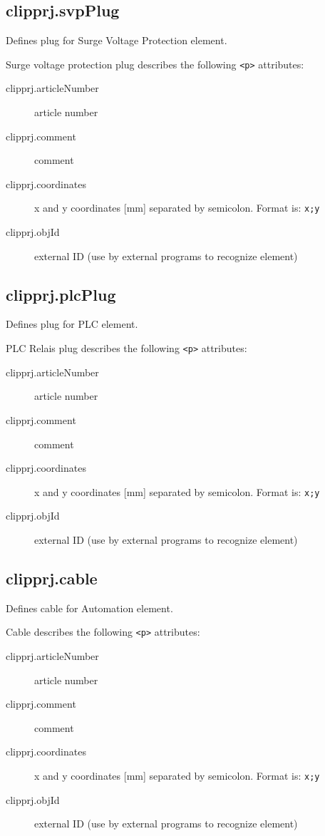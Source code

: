 \documentclass[%
	a4paper,
	oneside,
	listof=numbered,
	parskip=half,
	headsepline=true,
	footsepline=false,
	normalheadings,
	0.7headlines,
	headexclude,
	]{scrbook}
\begin{document}
\subsection{clipprj.svpPlug}

Defines plug for Surge Voltage Protection element.

Surge voltage protection plug describes the following \verb|<p>| attributes: 

\begin{description}
	\item[clipprj.articleNumber] article number 
	\item[clipprj.comment] comment 
	\item[clipprj.coordinates] x and y coordinates [mm] separated by semicolon.
	Format is: \verb|x;y|
	\item[clipprj.objId] external ID (use by external programs to recognize element)
\end{description}

\subsection{clipprj.plcPlug}

Defines plug for PLC element.

PLC Relais plug describes the following \verb|<p>| attributes: 

\begin{description}
	\item[clipprj.articleNumber] article number 
	\item[clipprj.comment] comment 
	\item[clipprj.coordinates] x and y coordinates [mm] separated by semicolon.
	Format is: \verb|x;y|
	\item[clipprj.objId] external ID (use by external programs to recognize element)
\end{description}

\subsection{clipprj.cable}

Defines cable for Automation element.

Cable describes the following \verb|<p>| attributes: 

\begin{description}
	\item[clipprj.articleNumber] article number 
	\item[clipprj.comment] comment 
	\item[clipprj.coordinates] x and y coordinates [mm] separated by semicolon.
	Format is: \verb|x;y|
	\item[clipprj.objId] external ID (use by external programs to recognize element)
\end{description}
\end{document}
